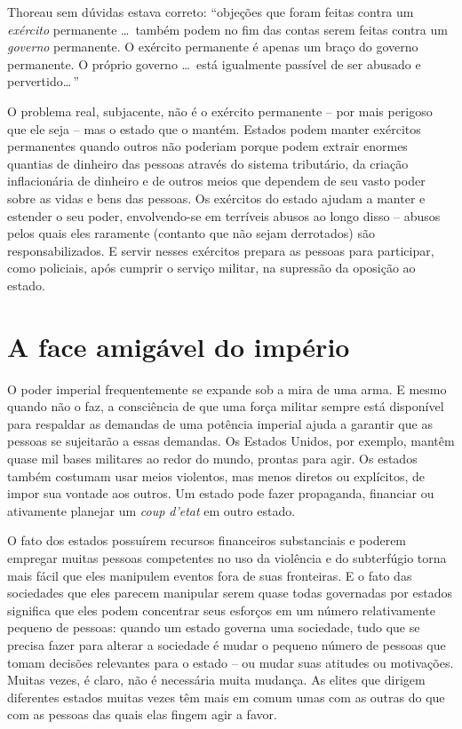 Thoreau sem dúvidas estava correto: ``objeções que foram feitas contra um \emph{exército} permanente \ldots\ também podem no fim das contas serem feitas contra um \emph{governo} permanente. O exército permanente é apenas um braço do governo permanente. O próprio governo \ldots\ está igualmente passível de ser abusado e pervertido\ldots\,''

O problema real, subjacente, não é o exército permanente -- por mais perigoso que ele seja -- mas o estado que o mantém. Estados podem manter exércitos permanentes quando outros não poderiam porque podem extrair enormes quantias de dinheiro das pessoas através do sistema tributário, da criação inflacionária de dinheiro e de outros meios que dependem de seu vasto poder sobre as vidas e bens das pessoas. Os exércitos do estado ajudam a manter e estender o seu poder, envolvendo-se em terríveis abusos ao longo disso -- abusos pelos quais eles raramente (contanto que não sejam derrotados) são responsabilizados. E servir nesses exércitos prepara as pessoas para participar, como policiais, após cumprir o serviço militar, na supressão da oposição ao estado.

\section{A face amigável do império}

O poder imperial frequentemente se expande sob a mira de uma arma. E mesmo quando não o faz, a consciência de que uma força militar sempre está disponível para respaldar as demandas de uma potência imperial ajuda a garantir que as pessoas se sujeitarão a essas demandas. Os Estados Unidos, por exemplo, mantêm quase mil bases militares ao redor do mundo, prontas para agir. Os estados também costumam usar meios violentos, mas menos diretos ou explícitos, de impor sua vontade aos outros. Um estado pode fazer propaganda, financiar ou ativamente planejar um \emph{coup d'etat} em outro estado.

O fato dos estados possuírem recursos financeiros substanciais e poderem empregar muitas pessoas competentes no uso da violência e do subterfúgio torna mais fácil que eles manipulem eventos fora de suas fronteiras. E o fato das sociedades que eles parecem manipular serem quase todas governadas por estados significa que eles podem concentrar seus esforços em um número relativamente pequeno de pessoas: quando um estado governa uma sociedade, tudo que se precisa fazer para alterar a sociedade é mudar o pequeno número de pessoas que tomam decisões relevantes para o estado -- ou mudar suas atitudes ou motivações. Muitas vezes, é claro, não é necessária muita mudança. As elites que dirigem diferentes estados muitas vezes têm mais em comum umas com as outras do que com as pessoas das quais elas fingem agir a favor.

